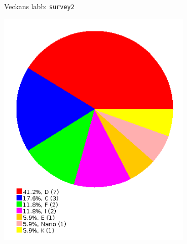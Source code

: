 \begin{Slide}{Veckans labb: \texttt{survey2}}
\begin{minipage}{0.27\textwidth}
\vspace{2em}\includegraphics[width=0.7\textwidth]{../img/survey/pie}
\end{minipage}
\end{Slide}


\fi











